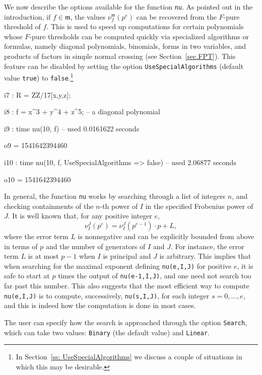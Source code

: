 \documentclass{amsart}
\begin{document}
We now describe the options available for the function \texttt{nu}.
As pointed out in the introduction, if $f \in \mathfrak{m}$, the values $\nu^{\mathfrak{m}}_f(p^e)$ can be recovered from the $F$-pure threshold of $f$.
This is used to speed up computations for certain polynomials whose $F$-pure thresholds can be computed quickly via specialized algorithms or formulas, namely diagonal polynomials, binomials, forms in two variables, and products of factors in simple normal crossing (see Section~\ref{sec.FPT}).
This feature can be disabled by setting the option \texttt{UseSpecialAlgorithms} (default value \texttt{true}) to \texttt{false}.\footnote{In Section~\ref{ss: UseSpecialAlgorithms} we discuss a couple of situations in which this may be desirable.}

\smallskip
{\small
{}
\begin{MyVerbatim}
i7 : R = ZZ/17[x,y,z];

i8 : f = x^3 + y^4 + z^5; -- a diagonal polynomial

i9 : time nu(10, f)
     -- used 0.0161622 seconds

o9 = 1541642394460

i10 : time nu(10, f, UseSpecialAlgorithms => false)
     -- used 2.06877 seconds

o10 = 1541642394460
\end{MyVerbatim}
}
\smallskip

In general, the function \texttt{nu} works by searching through a list of integers $n$, and checking containments of the $n$-th power of $I$ in the specified Frobenius power of $J$.
It is well known that, for any positive integer $e$,
\[ \nu_I^J(p^e) = \nu_I^J(p^{e-1})\cdot p + L,\]
where the error term $L$ is nonnegative and can be explicitly bounded from above in terms of $p$ and the number of generators of $I$ and $J$.
For instance, the error term $L$ is at most $p-1$ when $I$ is principal and $J$ is arbitrary.
This implies that when searching for the maximal exponent defining \texttt{nu(e,I,J)} for positive $e$, it is safe to start at $p$ times the output of \texttt{nu(e-1,I,J)}, and one need not search too far past this number.
This also suggests that the most efficient way to compute \texttt{nu(e,I,J)} is to compute, successively, \texttt{nu(s,I,J)}, for each integer $s = 0,\ldots,e$, and this is indeed how the computation is done in most cases.

The user can specify how the search is approached through the option \texttt{Search}, which can take two values: 
 \texttt{Binary} (the default value) and \texttt{Linear}.
\end{document}
